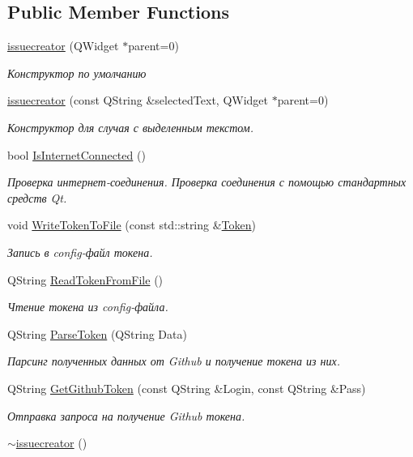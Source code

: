 \subsection*{Public Member Functions}
\begin{DoxyCompactItemize}
\item 
\hyperlink{classissuecreator_af18020b34fc69c9ffea22e7f748b8f96}{issuecreator} (Q\+Widget $\ast$parent=0)
\begin{DoxyCompactList}\small\item\em Конструктор по умолчанию \end{DoxyCompactList}\item 
\hyperlink{classissuecreator_ae623be0a0b031f1382b844133e51e1cb}{issuecreator} (const Q\+String \&selected\+Text, Q\+Widget $\ast$parent=0)
\begin{DoxyCompactList}\small\item\em Конструктор для случая с выделенным текстом. \end{DoxyCompactList}\item 
bool \hyperlink{classissuecreator_a9c4e6f82cc1c1523bbd92d38b35b75ad}{Is\+Internet\+Connected} ()
\begin{DoxyCompactList}\small\item\em Проверка интернет-\/соединения. Проверка соединения с помощью стандартных средств Qt. \end{DoxyCompactList}\item 
void \hyperlink{classissuecreator_a7d8b501ffe33324bad13029113674d3d}{Write\+Token\+To\+File} (const std\+::string \&\hyperlink{classissuecreator_ad8f87f64c334987f0316a3d3191d55c8}{Token})
\begin{DoxyCompactList}\small\item\em Запись в config-\/файл токена. \end{DoxyCompactList}\item 
Q\+String \hyperlink{classissuecreator_a52fc815f5dd3099817a1613f4af9de9b}{Read\+Token\+From\+File} ()
\begin{DoxyCompactList}\small\item\em Чтение токена из config-\/файла. \end{DoxyCompactList}\item 
Q\+String \hyperlink{classissuecreator_a32184b3842bd6352faeef506b85c649a}{Parse\+Token} (Q\+String Data)
\begin{DoxyCompactList}\small\item\em Парсинг полученных данных от Github и получение токена из них. \end{DoxyCompactList}\item 
Q\+String \hyperlink{classissuecreator_a332d178719de5c6905603d4715fe179f}{Get\+Github\+Token} (const Q\+String \&Login, const Q\+String \&Pass)
\begin{DoxyCompactList}\small\item\em Отправка запроса на получение Github токена. \end{DoxyCompactList}\item 
\hyperlink{classissuecreator_ac3f6c719cc0c836d709f92a166f5ee30}{$\sim$issuecreator} ()
\end{DoxyCompactItemize}
